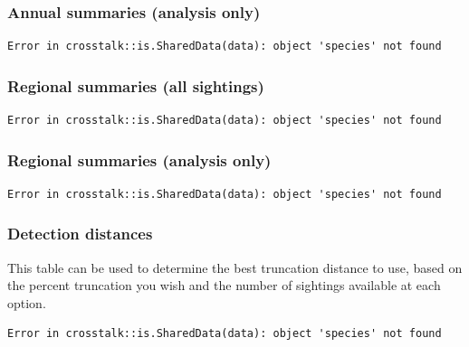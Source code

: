\documentclass[
]{book}
\begin{document}
\hypertarget{annual-summaries-analysis-only}{%
\subsubsection*{Annual summaries (analysis only)}\label{annual-summaries-analysis-only}}

\begin{verbatim}
Error in crosstalk::is.SharedData(data): object 'species' not found
\end{verbatim}

\hypertarget{regional-summaries-all-sightings}{%
\subsubsection*{Regional summaries (all sightings)}\label{regional-summaries-all-sightings}}

\begin{verbatim}
Error in crosstalk::is.SharedData(data): object 'species' not found
\end{verbatim}

\hypertarget{regional-summaries-analysis-only}{%
\subsubsection*{Regional summaries (analysis only)}\label{regional-summaries-analysis-only}}

\begin{verbatim}
Error in crosstalk::is.SharedData(data): object 'species' not found
\end{verbatim}

\hypertarget{detection-distances}{%
\subsubsection*{Detection distances}\label{detection-distances}}

This table can be used to determine the best truncation distance to use, based on the
percent truncation you wish and the number of sightings available at each option.

\begin{verbatim}
Error in crosstalk::is.SharedData(data): object 'species' not found
\end{verbatim}
\end{document}
